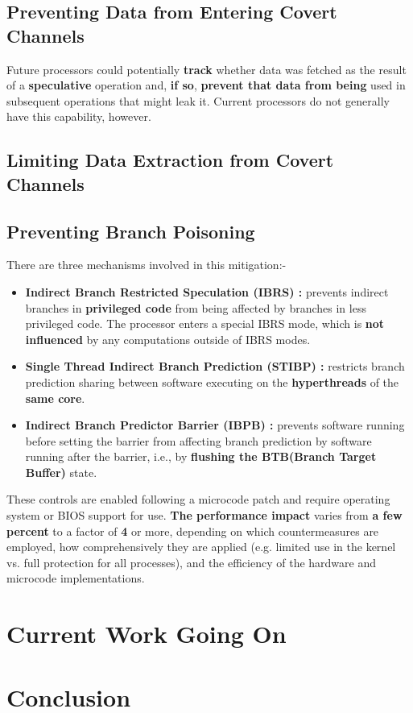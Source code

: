 \documentclass[12pt]{article}
\begin{document}
\subsection{Preventing Data from Entering Covert Channels}
Future processors could potentially \textbf{track} whether data was
fetched as the result of a \textbf{speculative} operation and, \textbf{if so},
\textbf{prevent that data from being} used in subsequent operations
that might leak it. Current processors do not generally have
this capability, however.
\subsection{Limiting Data Extraction from Covert Channels}
\subsection{Preventing Branch Poisoning}
There are three mechanisms involved in this mitigation:- 
\begin{itemize}
	\item \textbf{Indirect Branch Restricted Speculation (IBRS) : } prevents indirect branches in \textbf{privileged code} from being affected by branches in less privileged code. The processor enters a special IBRS mode, which is \textbf{not influenced} by any computations outside of IBRS modes.
	\item \textbf{Single Thread Indirect Branch Prediction (STIBP) : } restricts branch prediction sharing between software executing on the \textbf{hyperthreads} of the \textbf{same core}.
	\item \textbf{Indirect Branch Predictor Barrier (IBPB) : } prevents software running before setting the barrier from affecting branch prediction by software running after the barrier, i.e., by \textbf{flushing the BTB(Branch Target Buffer)} state.
\end{itemize}
These controls are enabled following a microcode patch and require operating system or BIOS support for use. \textbf{The performance impact} varies from \textbf{a few percent} to a factor of \textbf{4} or more, depending on which countermeasures are employed, how comprehensively they are applied (e.g. limited use in the kernel vs. full protection for all processes), and the efficiency of the hardware and microcode implementations.
\section{Current Work Going On}
\section{Conclusion}
\end{document}
